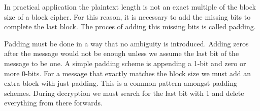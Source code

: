 In practical application the plaintext length is not an exact multiple of the block size of a block cipher.
For this reason, it is necessary to add the missing bits to complete the last block.
The proces of adding this missing bits is called padding.

Padding must be done in a way that no ambiguity is introduced.
Adding zeros after the message would not be enough unless we assume the last bit of the message to be one.
A simple padding scheme is appending a 1-bit and zero or more 0-bits.
For a message that exactly matches the block size we must add an extra block with just padding.
This is a common pattern amongst padding schemes.
During decryption we must search for the last bit with 1 and delete everything from there forwards.
